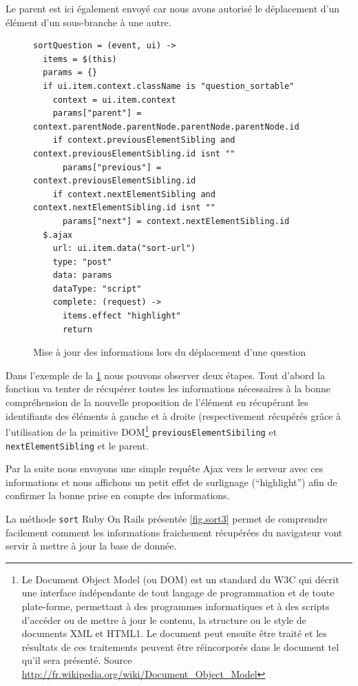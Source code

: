 \documentclass[12pt,a4paper]{book}
\begin{document}
Le parent est ici également envoyé car nous avons autorisé le déplacement d'un élément d'un sous-branche à une autre.

\begin{figure}[h]
\begin{lstlisting}
sortQuestion = (event, ui) ->
  items = $(this)
  params = {}
  if ui.item.context.className is "question_sortable"
    context = ui.item.context
    params["parent"] = context.parentNode.parentNode.parentNode.parentNode.id
    if context.previousElementSibling and context.previousElementSibling.id isnt ""
      params["previous"] = context.previousElementSibling.id
    if context.nextElementSibling and context.nextElementSibling.id isnt ""
      params["next"] = context.nextElementSibling.id 
  $.ajax
    url: ui.item.data("sort-url")
    type: "post"
    data: params
    dataType: "script"
    complete: (request) ->
      items.effect "highlight"
      return
\end{lstlisting}
 \caption{Mise à jour des informations lors du déplacement d'une question}
 \label{fig.sort2}
\end{figure}

Dans l'exemple de la \cref{fig.sort2} nous pouvons observer deux étapes. Tout d'abord la fonction va tenter de récupérer toutes les informations nécessaires à la bonne compréhension de la nouvelle proposition de l'élément en récupérant les identifiants des éléments à gauche et à droite (respectivement récupérés grâce à l'utilisation de la primitive DOM\footnote{Le Document Object Model (ou DOM) est un standard du W3C qui décrit une interface indépendante de tout langage de programmation et de toute plate-forme, permettant à des programmes informatiques et à des scripts d'accéder ou de mettre à jour le contenu, la structure ou le style de documents XML et HTML1. Le document peut ensuite être traité et les résultats de ces traitements peuvent être réincorporés dans le document tel qu'il sera présenté. Source \url{http://fr.wikipedia.org/wiki/Document_Object_Model}} \texttt{previousElementSibiling} et \texttt{nextElementSibling} et le parent.

Par la suite nous envoyons une simple requête Ajax vers le serveur avec ces informations et nous affichons un petit effet de surlignage (``highlight'') afin de confirmer la bonne prise en compte des informations.

La méthode \texttt{sort} Ruby On Rails présentée \cref{fig.sort3} permet de comprendre facilement comment les informations fraichement récupérées du navigateur vont servir à mettre à jour la base de donnée. 
\end{document}
